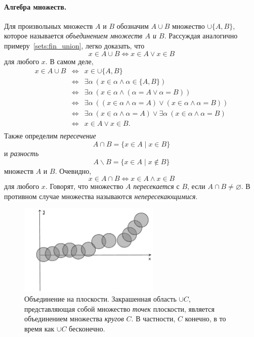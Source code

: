 \documentclass[12pt,notitlepage]{article}
\theoremstyle{plain}
\theoremstyle{definition}
\theoremstyle{plain}
\renewcommand{\setminus}{\smallsetminus}
\newcommand{\void}{\varnothing}
\newcommand{\1}{\mathbf{1}}
\newcommand{\0}{\mathbf{0}}
\begin{document}
\paragraph{Алгебра множеств.} Для произвольных множеств $A$ и $B$ обозначим $A \cup B$ множество $\cup\{A, B\}$, которое называется \emph{объединением множеств $A$ и $B$}. Рассуждая аналогично примеру~\ref{sets:fin_union}, легко доказать, что
$$x \in A \cup B \iff x \in A \vee x \in B$$
для любого $x$. В самом деле,
$$
\begin{array}{rcl}
	x \in A \cup B &\iff& x \in \cup\{ A, B \}\\
	&\iff&  \exists \alpha\ (x \in \alpha \wedge \alpha \in \{A, B\})\\
	&\iff& \exists \alpha\ (x \in \alpha \wedge (\alpha = A \vee \alpha = B))\\
	&\iff& \exists \alpha\ ((x \in \alpha \wedge \alpha = A) \vee (x \in \alpha \wedge \alpha = B) )\\
	&\iff& \exists \alpha\ (x \in \alpha \wedge \alpha = A) \vee \exists \alpha\ (x \in \alpha \wedge \alpha = B)\\
	&\iff& x \in A  \vee   x \in B.\\
\end{array}
$$
\noindent Также определим \emph{пересечение}
$$A \cap B = \{ x\in A \mid x \in B\}$$
и \emph{разность}
$$A \setminus B = \{x \in A \mid x \notin B\}$$
множеств $A$ и $B$. Очевидно,
$$x \in A \cap B \iff x \in A \wedge x \in B$$
для любого $x$. Говорят, что множество $A$ \emph{пересекается} с $B$, если $A \cap B \neq \void$. В противном случае множества называются \emph{непересекающимися}.

\begin{figure}[h]
	\centering
	\includegraphics*[width=0.6\textwidth]{union.pdf}
	\caption{Объединение на плоскости. Закрашенная область $\cup C$, представляющая собой множество \emph{точек} плоскости, является объединением множества \emph{кругов} $C$. В частности, $C$ конечно, в то время как $\cup C$ бесконечно.}
\end{figure}
\end{document}

